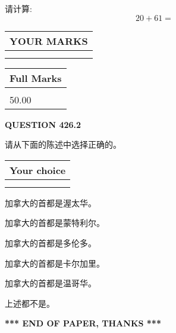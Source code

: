 \documentclass{ctexart}
\begin{document}
  
 
请计算:
\begin{equation}
20 +  %
61 = \nonumber
\end{equation}
 

 

 
  
\vspace{0.2in}
  
\noindent\begin{tabular}{|l|}
\hline
 YOUR MARKS  \\
\hline
 \\ 
 \\ 
\hline
\end{tabular}
\hspace{0.05in} \begin{tabular}{|l|}
\hline
 Full Marks  \\
\hline
 \\ 
50.00 \\
\hline
\end{tabular}
{\textbf{\Large{QUESTION
426.2 
}}}
  
  
请从下面的陈述中选择正确的。
  
  
\noindent\hspace{3.0in} \begin{tabular}{|l|}
\hline
Your choice \\
\hline
 \\ 
 \\ 
\hline
\end{tabular}
  
  
 
 
加拿大的首都是渥太华。
 
 
加拿大的首都是蒙特利尔。
 
 
加拿大的首都是多伦多。
 
 
加拿大的首都是卡尔加里。
 
 
加拿大的首都是温哥华。
 
 
 上述都不是。
 
 
   
   
 \vspace{0.2in}
 
   
   
   
   
\vspace{1.0in} 
{\textbf{\large{ *** END OF PAPER, THANKS *** }}} 
   
\end{document}
